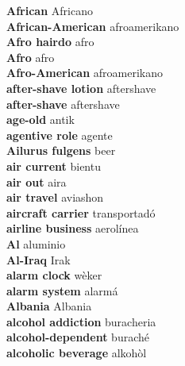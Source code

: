 \textbf{ African  } Africano \\
\textbf{ African-American  } afroamerikano \\
\textbf{ Afro hairdo  } afro \\
\textbf{ Afro  } afro \\
\textbf{ Afro-American  } afroamerikano \\
\textbf{ after-shave lotion  } aftershave \\
\textbf{ after-shave  } aftershave \\
\textbf{ age-old  } antik \\
\textbf{ agentive role  } agente \\
\textbf{ Ailurus fulgens  } beer \\
\textbf{ air current  } bientu \\
\textbf{ air out  } aira \\
\textbf{ air travel  } aviashon \\
\textbf{ aircraft carrier  } transportadó \\
\textbf{ airline business  } aerolínea \\
\textbf{ Al  } aluminio \\
\textbf{ Al-Iraq  } Irak \\
\textbf{ alarm clock  } wèker \\
\textbf{ alarm system  } alarmá \\
\textbf{ Albania  } Albania \\
\textbf{ alcohol addiction  } buracheria \\
\textbf{ alcohol-dependent  } buraché \\
\textbf{ alcoholic beverage  } alkohòl \\
